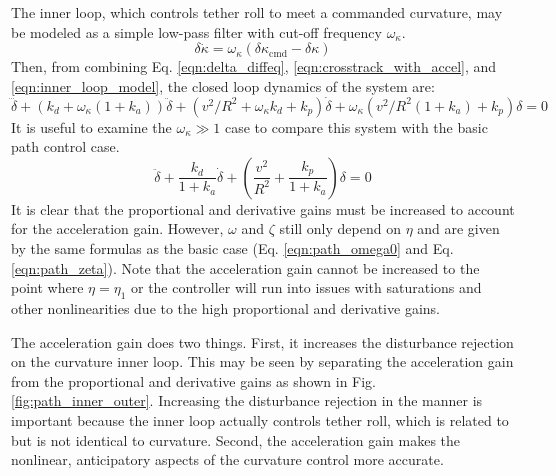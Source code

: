 \documentclass{article} %
\begin{document}
The inner loop, which controls tether roll to meet a commanded
curvature, may be modeled as a simple low-pass filter with cut-off
frequency $\omega_{\kappa}$.
\begin{equation}
  \delta \dot{\kappa} = \omega_{\kappa}
  (\delta \kappa_{\mathrm{cmd}} - \delta \kappa)
  \label{eqn:inner_loop_model}
\end{equation}
%
Then, from combining Eq. \ref{eqn:delta_diffeq},
\ref{eqn:crosstrack_with_accel}, and \ref{eqn:inner_loop_model}, the
closed loop dynamics of the system are:
\begin{equation}
  \dddot{\delta} + (k_d + \omega_{\kappa} (1 + k_a)) \ddot{\delta} +
  (v^2/R^2 + \omega_{\kappa} k_d + k_p) \dot{\delta} +
  \omega_{\kappa} (v^2/R^2 (1 + k_a) + k_p) \delta = 0
\end{equation}
%
It is useful to examine the $\omega_{\kappa} \gg 1$ case to compare
this system with the basic path control case.
\begin{equation}
  \ddot{\delta} + \frac{k_d}{1 + k_a} \dot{\delta} +
  \left(\frac{v^2}{R^2} + \frac{k_p}{1 + k_a} \right) \delta = 0
\end{equation}
%
It is clear that the proportional and derivative gains must be
increased to account for the acceleration gain.  However, $\omega$ and
$\zeta$ still only depend on $\eta$ and are given by the same formulas
as the basic case (Eq. \ref{eqn:path_omega0} and
Eq. \ref{eqn:path_zeta}).  Note that the acceleration gain cannot be
increased to the point where $\eta = \eta_1$ or the controller will
run into issues with saturations and other nonlinearities due to the
high proportional and derivative gains.

The acceleration gain does two things.  First, it increases the
disturbance rejection on the curvature inner loop.  This may be seen
by separating the acceleration gain from the proportional and
derivative gains as shown in Fig. \ref{fig:path_inner_outer}.
Increasing the disturbance rejection in the manner is important
because the inner loop actually controls tether roll, which is related
to but is not identical to curvature.  Second, the acceleration gain
makes the nonlinear, anticipatory aspects of the curvature control
more accurate.
\end{document}
